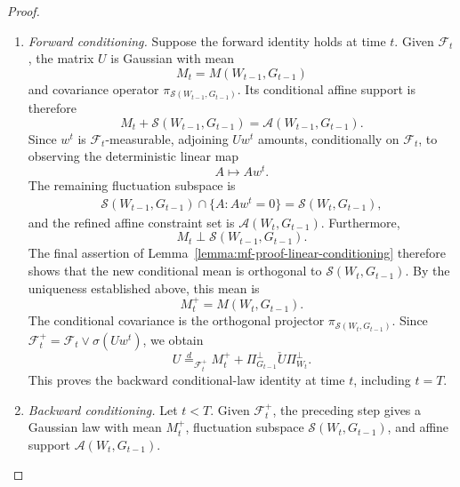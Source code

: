 \begin{proof}
\begin{enumerate}[wide]
            \item \emph{Forward conditioning.}
            Suppose the forward identity holds at time $t$.
            Given $\mathcal F_t$, the matrix $U$ is Gaussian
            with mean
            \[
                M_t=M(W_{t-1},G_{t-1})
            \]
            and covariance operator $\pi_{\mathcal S({W_{t-1},G_{t-1}})}$.
            Its conditional affine support is therefore
            \[
                M_t+\mathcal S(W_{t-1},G_{t-1})
                =
                \mathcal A(W_{t-1},G_{t-1}).
            \]
            Since $w^t$ is $\mathcal F_t$-measurable, adjoining
            $Uw^t$ amounts, conditionally on $\mathcal F_t$,
            to observing the deterministic linear map
            \[
                A\longmapsto Aw^t.
            \]
            The remaining fluctuation subspace is
            \[
            \begin{aligned}
                \mathcal S(W_{t-1},G_{t-1})
                \cap\{A:Aw^t=0\}
                =
                \mathcal S(W_t,G_{t-1}),
            \end{aligned}
            \]
            and the refined affine constraint set is
            \(
                \mathcal A(W_t,G_{t-1})
            \).
            Furthermore,
            \[
                M_t\perp\mathcal S(W_{t-1},G_{t-1}).
            \]
            The final assertion of
            Lemma~\ref{lemma:mf-proof-linear-conditioning}
            therefore shows that the new conditional mean
            is orthogonal to $\mathcal S(W_t,G_{t-1})$.
            By the uniqueness established above, this mean is
            \[
                M_t^+
                =
                M(W_t,G_{t-1}).
            \]
            The conditional covariance is the orthogonal
            projector $\pi_{\mathcal S(W_t,G_{t-1})}$.
            Since
            $\mathcal F_t^+=\mathcal F_t\vee\sigma(Uw^t)$,
            we obtain
            \[
                U\stackrel d=_{\mathcal F_t^+}
                M_t^+
                +\Pi_{G_{t-1}}^\perp
                    \check U\Pi_{W_t}^\perp.
            \]
            This proves the backward conditional-law identity
            at time $t$, including $t=T$.
        
            \item \emph{Backward conditioning.}
            Let $t<T$.
            Given $\mathcal F_t^+$, the preceding step gives
            a Gaussian law with mean $M_t^+$, fluctuation
            subspace $\mathcal S(W_t,G_{t-1})$, and affine support
            $\mathcal A(W_t,G_{t-1})$.
        

\end{enumerate}
\end{proof}
